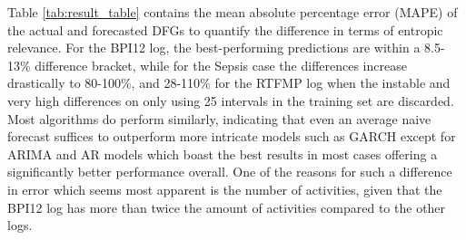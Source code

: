 Table \ref{tab:result_table} contains the mean absolute percentage error (MAPE) of the actual and forecasted DFGs to quantify the difference in terms of entropic relevance.
For the BPI12 log, the best-performing predictions are within a 8.5-13\% difference bracket, while for the Sepsis case the differences increase drastically to 80-100\%, and 28-110\% for the RTFMP log when the instable and very high differences on only using 25 intervals in the training set are discarded.
Most algorithms do perform similarly, indicating that even an average naive forecast suffices to outperform more intricate models such as GARCH except for ARIMA and AR models which boast the best results in most cases offering a significantly better performance overall.
One of the reasons for such a difference in error which seems most apparent is the number of activities, given that the BPI12 log has more than twice the amount of activities compared to the other logs. 

